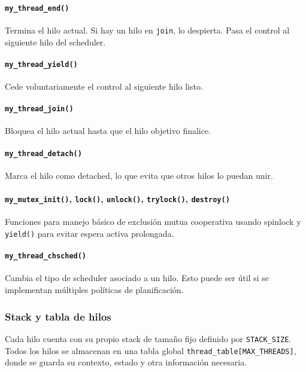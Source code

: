 \documentclass[12pt]{article}
\begin{document}
\paragraph{\texttt{my\_thread\_end()}} Termina el hilo actual. Si hay un hilo en \texttt{join}, lo despierta. Pasa el control al siguiente hilo del scheduler.

\paragraph{\texttt{my\_thread\_yield()}} Cede voluntariamente el control al siguiente hilo listo.

\paragraph{\texttt{my\_thread\_join()}} Bloquea el hilo actual hasta que el hilo objetivo finalice.

\paragraph{\texttt{my\_thread\_detach()}} Marca el hilo como detached, lo que evita que otros hilos lo puedan unir.

\paragraph{\texttt{my\_mutex\_init()}, \texttt{lock()}, \texttt{unlock()}, \texttt{trylock()}, \texttt{destroy()}} Funciones para manejo básico de exclusión mutua cooperativa usando spinlock y \texttt{yield()} para evitar espera activa prolongada.

\paragraph{\texttt{my\_thread\_chsched()}} Cambia el tipo de scheduler asociado a un hilo. Esto puede ser útil si se implementan múltiples políticas de planificación.

\subsubsection*{Stack y tabla de hilos}

Cada hilo cuenta con su propio stack de tamaño fijo definido por \texttt{STACK\_SIZE}. Todos los hilos se almacenan en una tabla global \texttt{thread\_table[MAX\_THREADS]}, donde se guarda su contexto, estado y otra información necesaria.
\end{document}
